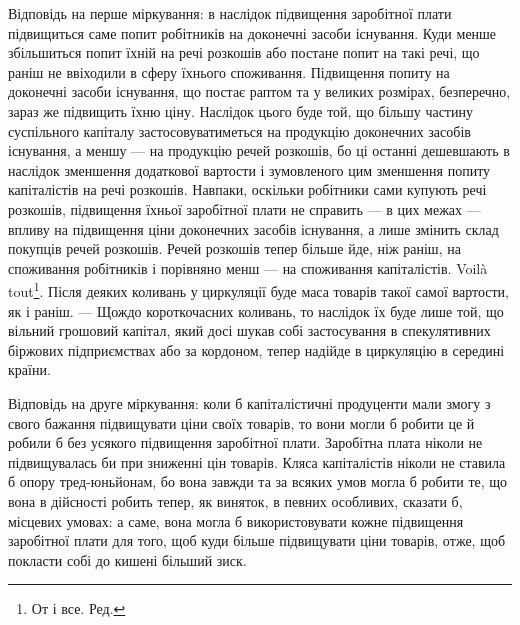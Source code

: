 Відповідь на перше міркування: в наслідок підвищення заробітної
плати підвищиться саме попит робітників на доконечні засоби існування.
Куди менше збільшиться попит їхній на речі розкошів або постане попит
на такі речі, що раніш не ввіходили в сферу їхнього споживання. Підвищення
попиту на доконечні засоби існування, що постає раптом та у
великих розмірах, безперечно, зараз же підвищить їхню ціну. Наслідок
цього буде той, що більшу частину суспільного капіталу застосовуватиметься
на продукцію доконечних засобів існування, а меншу — на продукцію
речей розкошів, бо ці останні дешевшають в наслідок зменшення
додаткової вартости і зумовленого цим зменшення попиту капіталістів на
речі розкошів. Навпаки, оскільки робітники сами купують речі розкошів,
підвищення їхньої заробітної плати не справить — в цих межах — впливу на
підвищення ціни доконечних засобів існування, а лише змінить склад
покупців речей розкошів. Речей розкошів тепер більше йде, ніж раніш,
на споживання робітників і порівняно менш — на споживання капіталістів.
Voilà tout\footnote*{
От і все. Ред.
}. Після деяких коливань у циркуляції буде маса товарів такої
самої вартости, як і раніш. — Щождо короткочасних коливань, то наслідок
їх буде лише той, що вільний грошовий капітал, який досі шукав собі
застосування в спекулятивних біржових підприємствах або за кордоном,
тепер надійде в циркуляцію в середині країни.

Відповідь на друге міркування: коли б капіталістичні продуценти
мали змогу з свого бажання підвищувати ціни своїх товарів, то вони
могли б робити це й робили б без усякого підвищення заробітної плати.
Заробітна плата ніколи не підвищувалась би при зниженні цін товарів.
Кляса капіталістів ніколи не ставила б опору тред-юньйонам, бо вона
завжди та за всяких умов могла б робити те, що вона в дійсності робить
тепер, як виняток, в певних особливих, сказати б, місцевих умовах:
а саме, вона могла б використовувати кожне підвищення заробітної плати
для того, щоб куди більше підвищувати ціни товарів, отже, щоб покласти
собі до кишені більший зиск.

